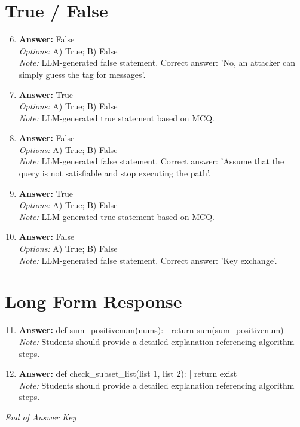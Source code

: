 \documentclass[12pt]{article}
\begin{document}
\section*{True / False}
\begin{enumerate}[label=\arabic*.]
\setcounter{enumi}{5}
\item \textbf{Answer:} False
\\ \textit{Options:} A) True; B) False
\\ \textit{Note:} LLM-generated false statement. Correct answer: 'No, an attacker can simply guess the tag for messages'.
\item \textbf{Answer:} True
\\ \textit{Options:} A) True; B) False
\\ \textit{Note:} LLM-generated true statement based on MCQ.
\item \textbf{Answer:} False
\\ \textit{Options:} A) True; B) False
\\ \textit{Note:} LLM-generated false statement. Correct answer: 'Assume that the query is not satisfiable and stop executing the path'.
\item \textbf{Answer:} True
\\ \textit{Options:} A) True; B) False
\\ \textit{Note:} LLM-generated true statement based on MCQ.
\item \textbf{Answer:} False
\\ \textit{Options:} A) True; B) False
\\ \textit{Note:} LLM-generated false statement. Correct answer: 'Key exchange'.
\end{enumerate}

\section*{Long Form Response}
\begin{enumerate}[label=\arabic*.]
\setcounter{enumi}{10}
\item \textbf{Answer:} def sum\_positivenum(nums): | return sum(sum\_positivenum)
\\ \textit{Note:} Students should provide a detailed explanation referencing algorithm steps.
\item \textbf{Answer:} def check\_subset\_list(list 1, list 2): | return exist
\\ \textit{Note:} Students should provide a detailed explanation referencing algorithm steps.
\end{enumerate}

\vfill
\noindent\textit{End of Answer Key}
\end{document}
